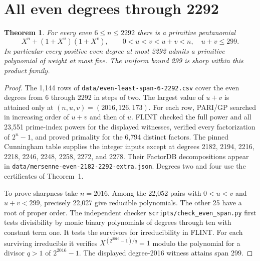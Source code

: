 \documentclass[11pt]{article}
\newtheorem{theorem}{Theorem}
\begin{document}
\section{All even degrees through 2292}
\begin{theorem}\label{thm:even2292}
For every even \(6\le n\le2292\) there is a primitive pentanomial
\[
   X^n+(1+X^u)(1+X^v),\qquad 0<u<v<u+v<n,\quad u+v\le299.
\]
In particular every positive even degree at most 2292 admits a
primitive polynomial of weight at most five. The uniform bound 299
is sharp within this product family.
\end{theorem}
\begin{proof}
The 1,144 rows of \nolinkurl{data/even-least-span-6-2292.csv} cover the
even degrees from 6 through 2292 in steps of two. The largest value
of \(u+v\) is attained only at \((n,u,v)=(2016,126,173)\).
For each row, PARI/GP searched in increasing order of \(u+v\) and then
of \(u\). FLINT checked the full power and all 23,551 prime-index
powers for the displayed witnesses, verified every factorization of
\(2^n-1\), and proved primality for the 6,794 distinct factors.
The pinned Cunningham table supplies the integer inputs except at
degrees 2182, 2194, 2216, 2218, 2246, 2248, 2258, 2272, and 2278.
Their FactorDB decompositions appear in
\nolinkurl{data/mersenne-even-2182-2292-extra.json}.
Degrees two and four use the certificates of Theorem~1.

To prove sharpness take \(n=2016\). Among the 22,052 pairs with
\(0<u<v\) and \(u+v<299\), precisely 22,027 give reducible
polynomials. The other 25 have a root of proper order.
The independent checker \nolinkurl{scripts/check_even_span.py}
first tests divisibility by monic binary polynomials of degrees
through ten with constant term one. It tests the survivors for
irreducibility in FLINT. For each surviving irreducible it verifies
\(X^{(2^{2016}-1)/q}=1\) modulo the polynomial for a divisor
\(q>1\) of \(2^{2016}-1\). The displayed degree-2016 witness
attains span 299.
\end{proof}
\end{document}
